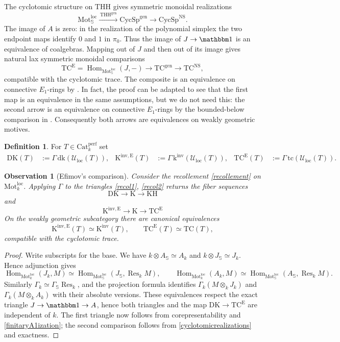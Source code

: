 \documentclass{amsart}
\theoremstyle{plain}
\newtheorem{obs}[prop]{Observation}
\theoremstyle{definition}
\newtheorem{defi}[prop]{Definition}
\newcommand{\lra}{\longrightarrow}
\newcommand{\bbS}{\mathbb{S}}
\newcommand{\Catperf}{\mathrm{Cat}^{\mathrm{perf}}}
\newcommand{\Motloc}{\mathrm{Mot}^{\mathrm{loc}}}
\newcommand{\Uloc}{\mathcal U_{\mathrm{loc}}}
\newcommand{\TC}{\mathrm{TC}}
\newcommand{\K}{\mathrm{K}}
\newcommand{\KH}{\mathrm{KH}}
\newcommand{\DK}{\mathrm{DK}}
\newcommand{\THH}{\mathrm{THH}}
\newcommand{\dk}{\mathrm{dk}}
\newcommand{\tc}{\mathrm{tc}}
\newcommand{\kinv}{\mathrm{k}^{\mathrm{inv}}}
\newcommand{\CycSp}{\mathrm{CycSp}}
\DeclareMathOperator{\Hom}{Hom}
\DeclareMathOperator{\Res}{Res}
\newcommand{\NS}{\mathrm{NS}}
\newcommand{\gen}{\mathrm{gen}}
\begin{document}
The cyclotomic structure on $\THH$ gives symmetric monoidal realizations
\[
\Motloc_\bbS\xrightarrow{\,\THH^{\gen}\,}
\CycSp^{\gen}
\longrightarrow\CycSp^{\NS}.
\]
The image of $A$ is zero: in the realization of the polynomial simplex the two endpoint maps identify $0$ and $1$ in $\pi_0$. Thus the image of
$J\to\mathbbm1$ is an equivalence of coalgebras. Mapping out of $J$ and then out of its image gives natural lax symmetric monoidal comparisons
\begin{equation}\label{cyclotomicrealizations}
\TC^{\mathrm{E}}=\Hom_{\Motloc_\bbS}(J,-)
\longrightarrow \TC^{\gen}\longrightarrow \TC^{\NS},
\end{equation}
compatible with the cyclotomic trace. The composite is an equivalence on connective $E_1$-rings by \cite[Theorem 9.3]{Efi25b}. In fact, the proof can be adapted to see that the first map is an equivalence in the same assumptions, but we do not need this: the second arrow is an equivalence on connective $E_1$-rings by the bounded-below comparison in \cite{NS18}.
Consequently both arrows are equivalences on weakly geometric motives.

\begin{defi}\label{defrecolinvariants}
For $T\in\Catperf_k$ set
\[
\begin{aligned}
\DK(T)&:=\Gamma\,\dk(\Uloc(T)),
& \K^{\mathrm{inv},\mathrm{E}}(T)&:=\Gamma\,\kinv(\Uloc(T)),
& \TC^{\mathrm{E}}(T)&:=\Gamma\,\tc(\Uloc(T)).
\end{aligned}
\]
\end{defi}


\begin{obs}[Efimov's comparison]\label{obscomparisonclassical}
Consider the recollement \eqref{recollement} on $\Motloc_k$. Applying $\Gamma$ to the triangles \eqref{recol1}, \eqref{recol2} returns the fiber sequences
\[
\DK\longrightarrow \K\longrightarrow \KH
\]
and
\[
\K^{\mathrm{inv},\mathrm{E}} \lra \K \lra \TC^{\mathrm{E}}
\]
On the weakly geometric subcategory there are canonical equivalences
\[
\K^{\mathrm{inv},\mathrm{E}}(T)\simeq \K^{\mathrm{inv}}(T),
\qquad
\TC^{\mathrm{E}}(T)\simeq \TC(T),
\]
compatible with the cyclotomic trace.
\end{obs}

\begin{proof}
Write subscripts for the base. We have $k\otimes A_\bbS\simeq A_k$ and
$k\otimes J_\bbS\simeq J_k$. Hence adjunction gives
\[
\Hom_{\Motloc_k}(J_k,M)\simeq\Hom_{\Motloc_\bbS}(J_\bbS,\Res_kM),\qquad
\Hom_{\Motloc_k}(A_k,M)\simeq\Hom_{\Motloc_\bbS}(A_\bbS,\Res_kM).
\]
Similarly $\Gamma_k\simeq\Gamma_\bbS \Res_k$, and the projection formula identifies $\Gamma_k(M\otimes_kJ_k)$ and
$\Gamma_k(M\otimes_kA_k)$ with their absolute versions.
These equivalences respect the exact triangle $J\to\mathbbm1\to A$, hence both triangles and the map $\DK\to \TC^{\mathrm{E}}$ are independent of $k$.
The first triangle now follows from corepresentability and
\eqref{finitaryA1ization}; the second comparison follows from
\eqref{cyclotomicrealizations} and exactness.
\end{proof}
\end{document}
